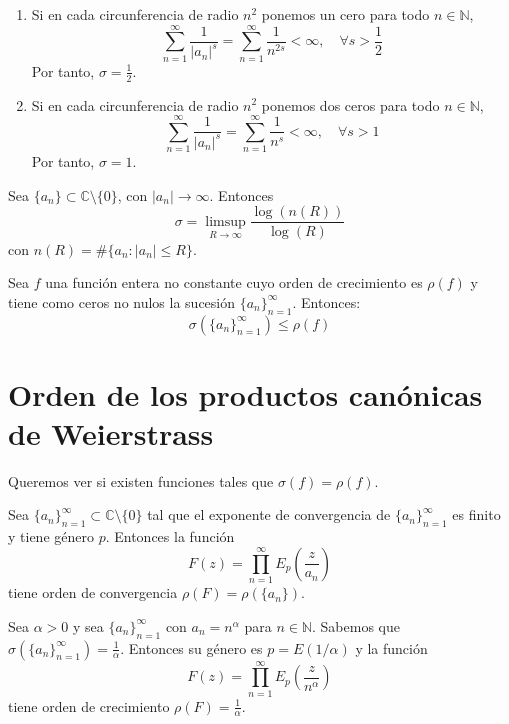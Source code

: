 \begin{example}
    \hfill
    \begin{enumerate}
        \item Si en cada circunferencia de radio $n^2$ ponemos un cero para todo $n \in \mathbb{N}$,
              $$\sum_{n=1}^\infty \frac{1}{|a_n|^s} = \sum_{n=1}^\infty \frac{1}{n^{2s}} < \infty, \quad \forall s > \frac{1}{2}$$
              Por tanto, $\sigma = \frac{1}{2}$.

        \item Si en cada circunferencia de radio $n^2$ ponemos dos ceros para todo $n \in \mathbb{N}$,
              $$\sum_{n=1}^\infty \frac{1}{|a_n|^s} = \sum_{n=1}^\infty \frac{1}{n^{s}} < \infty, \quad \forall s > 1$$
              Por tanto, $\sigma = 1$.
    \end{enumerate}
\end{example}

\begin{lemma}
    Sea $\{a_n\} \subset \mathbb{C} \setminus \{0\}$, con $|a_n| \to \infty$.
    Entonces
    $$\sigma = \limsup_{R \to \infty} \frac{\log(n(R))}{\log(R)}$$
    con $n(R) = \#\{a_n : |a_n| \leq R\}$.
\end{lemma}


\begin{theorem}
    Sea $f$ una función entera no constante cuyo orden de crecimiento es $\rho(f)$ y tiene como ceros no nulos la sucesión $\{a_n\}_{n=1}^\infty$.
    Entonces:
    $$\sigma(\{a_n\}_{n=1}^\infty) \leq \rho(f)$$
\end{theorem}


\section{Orden de los productos canónicas de Weierstrass}
Queremos ver si existen funciones tales que $\sigma(f) = \rho(f)$.

\begin{theorem}
    Sea $\{a_n\}_{n=1}^\infty \subset \mathbb{C} \setminus \{0\}$ tal que el exponente de convergencia de $\{a_n\}_{n=1}^\infty$ es finito y tiene género $p$.
    Entonces la función
    $$F(z) = \prod_{n=1}^\infty E_p\left(\frac{z}{a_n}\right)$$
    tiene orden de convergencia $\rho(F) = \rho(\{a_n\})$.
\end{theorem}

\begin{example}
    Sea $\alpha > 0$ y sea $\{a_n\}_{n=1}^\infty$ con $a_n = n^\alpha$ para $n \in \mathbb{N}$.
    Sabemos que $\sigma(\{a_n\}_{n=1}^\infty) = \frac{1}{\alpha}$.
    Entonces su género es $p = E(1/\alpha)$ y la función
    $$F(z) = \prod_{n=1}^\infty E_p\left(\frac{z}{n^\alpha}\right)$$
    tiene orden de crecimiento $\rho(F) = \frac{1}{\alpha}$.
\end{example}


